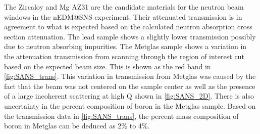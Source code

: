 The Zircaloy and Mg AZ31 are the candidate materials for the neutron beam windows in the nEDM@SNS experiment. Their attenuated transmission is in agreement to what is expected based on the calculated neutron absorption cross section attenuation. The lead sample shows a slightly lower transmission possibly due to neutron absorbing impurities. The Metglas sample shows a variation in the attenuation transmission from scanning through the region of interest cut based on the expected beam size. This is shown as the red band in \cref{fig:SANS_trans}. This variation in transmission from Metglas was caused by the fact that the beam was not centered on the sample center as well as the presence of a large incoherent scattering at high Q shown in \cref{fig:SANS_2D}. There is also uncertainty in the percent composition of boron in the Metglas sample. Based on the transmission data in \cref{fig:SANS_trans}, the percent mass composition of boron in Metglas can be deduced as 2\% to 4\%.  






